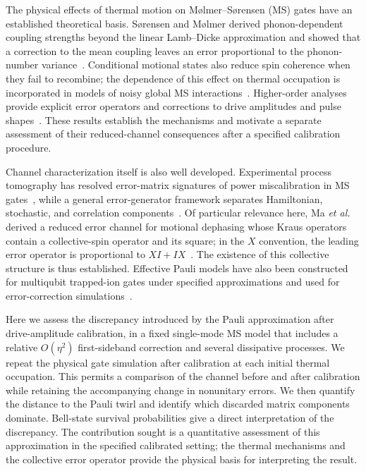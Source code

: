 \documentclass[a4paper,11pt]{article}
\begin{document}
The physical effects of thermal motion on M{\o}lmer--S{\o}rensen (MS)
gates have an established theoretical basis. S{\o}rensen and
M{\o}lmer derived phonon-dependent coupling strengths beyond the
linear Lamb--Dicke approximation and showed that a correction to the
mean coupling leaves an error proportional to the phonon-number
variance~\cite{MS2000}. Conditional motional states also reduce spin
coherence when they fail to recombine; the dependence of this effect on
thermal occupation is incorporated in models of noisy global MS
interactions~\cite{Lotshaw2023}. Higher-order analyses provide
explicit error operators and corrections to drive amplitudes and pulse
shapes~\cite{Kirchhoff2025}. These results establish the mechanisms
and motivate a separate assessment of their reduced-channel
consequences after a specified calibration procedure.

Channel characterization itself is also well developed. Experimental
process tomography has resolved error-matrix signatures of power
miscalibration in MS gates~\cite{Tinkey2021}, while a general
error-generator framework separates Hamiltonian, stochastic, and
correlation components~\cite{Markovian_Errors}. Of particular
relevance here, Ma \textit{et al.} derived a reduced error channel for
motional dephasing whose Kraus operators contain a collective-spin
operator and its square; in the $X$ convention, the leading error
operator is proportional to $XI+IX$~\cite{Ma2025}. The existence of
this collective structure is thus established. Effective Pauli models
have also been constructed for multiqubit trapped-ion gates under
specified approximations and used for error-correction
simulations~\cite{Grossman2026}.

Here we assess the discrepancy introduced by the Pauli approximation
after drive-amplitude calibration, in a fixed single-mode MS model
that includes a relative $O(\eta^2)$ first-sideband correction and
several dissipative processes. We repeat the physical gate simulation
after calibration at each initial thermal occupation. This permits a
comparison of the channel before and after calibration while retaining
the accompanying change in nonunitary errors. We then quantify the
distance to the Pauli twirl and identify which discarded matrix
components dominate. Bell-state survival probabilities give a direct
interpretation of the discrepancy. The contribution sought is a
quantitative assessment of this approximation in the specified
calibrated setting; the thermal mechanisms and the collective
error operator provide the physical basis for interpreting the result.
\end{document}
